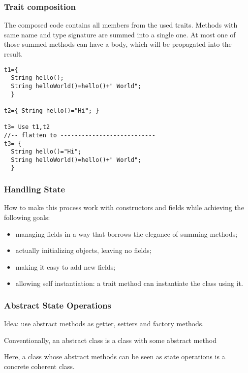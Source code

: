 \begin{frame}[fragile]
\frametitle{Trait composition}
The composed code contains all members from the used traits.
Methods with same name and type signature are summed into a single one.
At most one of those summed methods
can have a body, which will be propagated into the result.

\begin{lstlisting}
t1={
  String hello();
  String helloWorld()=hello()+" World";
  }

t2={ String hello()="Hi"; }

t3= Use t1,t2
//-- flatten to ---------------------------
t3= {
  String hello()="Hi";
  String helloWorld()=hello()+" World";
  }
\end{lstlisting}
\end{frame}

\begin{frame}[fragile]
\frametitle{Handling State}
How to make this process work with constructors and fields
while achieving the following goals:
\begin{itemize}
\item managing fields in a way that borrows the elegance of summing methods;
\item actually initializing objects, leaving no \Q@null@ fields;
\item making it easy to add new fields;
\item allowing self instantiation: a trait method can instantiate the class using it.
\end{itemize}

\end{frame}

\begin{frame}[fragile]
\frametitle{Abstract State Operations}
Idea: use abstract methods as getter, setters and factory methods.

Conventionally, an abstract class is a class with some abstract method

Here, a class whose abstract methods can be seen as state operations is a
concrete coherent class.

\end{frame}

